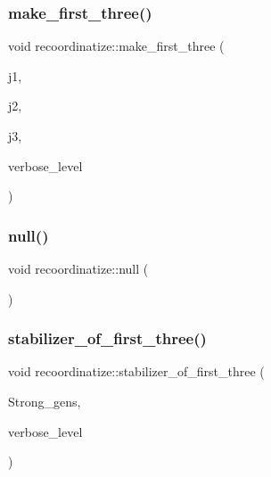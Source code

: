 \mbox{\label{classrecoordinatize_ad84ccf8f6e33a887fbd460b87df278bd}} 
\subsubsection{\texorpdfstring{make\+\_\+first\+\_\+three()}{make\_first\_three()}}
{\footnotesize\ttfamily void recoordinatize\+::make\+\_\+first\+\_\+three (\begin{DoxyParamCaption}\item[{\mbox{\hyperlink{galois_8h_a09fddde158a3a20bd2dcadb609de11dc}{I\+NT}} \&}]{j1,  }\item[{\mbox{\hyperlink{galois_8h_a09fddde158a3a20bd2dcadb609de11dc}{I\+NT}} \&}]{j2,  }\item[{\mbox{\hyperlink{galois_8h_a09fddde158a3a20bd2dcadb609de11dc}{I\+NT}} \&}]{j3,  }\item[{\mbox{\hyperlink{galois_8h_a09fddde158a3a20bd2dcadb609de11dc}{I\+NT}}}]{verbose\+\_\+level }\end{DoxyParamCaption})}

\mbox{\label{classrecoordinatize_a64a3ae223d272051c4ab32ceba842f24}} 
\subsubsection{\texorpdfstring{null()}{null()}}
{\footnotesize\ttfamily void recoordinatize\+::null (\begin{DoxyParamCaption}{ }\end{DoxyParamCaption})}

\mbox{\label{classrecoordinatize_ae8a24e776a57f0ac4923f6ed1d1db6e6}} 
\subsubsection{\texorpdfstring{stabilizer\+\_\+of\+\_\+first\+\_\+three()}{stabilizer\_of\_first\_three()}}
{\footnotesize\ttfamily void recoordinatize\+::stabilizer\+\_\+of\+\_\+first\+\_\+three (\begin{DoxyParamCaption}\item[{\mbox{\hyperlink{classstrong__generators}{strong\+\_\+generators}} $\ast$\&}]{Strong\+\_\+gens,  }\item[{\mbox{\hyperlink{galois_8h_a09fddde158a3a20bd2dcadb609de11dc}{I\+NT}}}]{verbose\+\_\+level }\end{DoxyParamCaption})}



